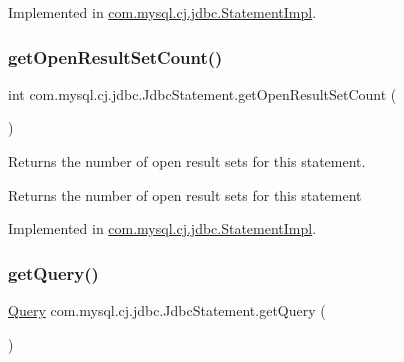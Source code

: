 Implemented in \mbox{\hyperlink{classcom_1_1mysql_1_1cj_1_1jdbc_1_1_statement_impl_a52f35ba4029870388a69d493851e726a}{com.\+mysql.\+cj.\+jdbc.\+Statement\+Impl}}.

\mbox{\label{interfacecom_1_1mysql_1_1cj_1_1jdbc_1_1_jdbc_statement_ad7367340b87accdd66c01872ebaddbcd}} 
\subsubsection{\texorpdfstring{get\+Open\+Result\+Set\+Count()}{getOpenResultSetCount()}}
{\footnotesize\ttfamily int com.\+mysql.\+cj.\+jdbc.\+Jdbc\+Statement.\+get\+Open\+Result\+Set\+Count (\begin{DoxyParamCaption}{ }\end{DoxyParamCaption})}

Returns the number of open result sets for this statement.

\begin{DoxyReturn}{Returns}
the number of open result sets for this statement 
\end{DoxyReturn}


Implemented in \mbox{\hyperlink{classcom_1_1mysql_1_1cj_1_1jdbc_1_1_statement_impl_ac4a8718b3d1e416f72dbe33370434b0d}{com.\+mysql.\+cj.\+jdbc.\+Statement\+Impl}}.

\mbox{\label{interfacecom_1_1mysql_1_1cj_1_1jdbc_1_1_jdbc_statement_a6ebd2f09956035be03e076980dce5528}} 
\subsubsection{\texorpdfstring{get\+Query()}{getQuery()}}
{\footnotesize\ttfamily \mbox{\hyperlink{interfacecom_1_1mysql_1_1cj_1_1_query}{Query}} com.\+mysql.\+cj.\+jdbc.\+Jdbc\+Statement.\+get\+Query (\begin{DoxyParamCaption}{ }\end{DoxyParamCaption})}



